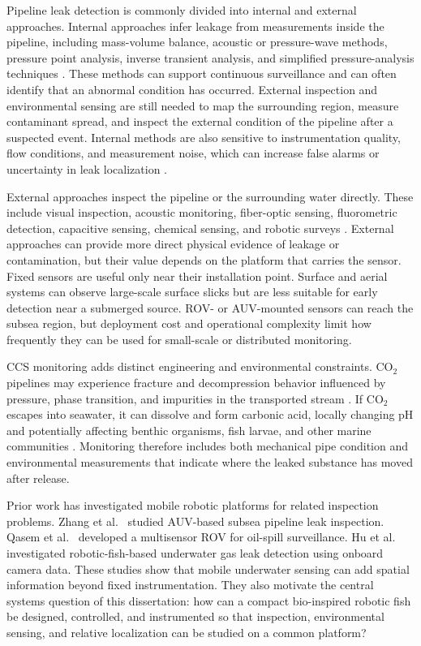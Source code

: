 \documentclass{uhcoethesis}
\begin{document}
Pipeline leak detection is commonly divided into internal and external approaches. Internal approaches infer leakage from measurements inside the pipeline, including mass-volume balance, acoustic or pressure-wave methods, pressure point analysis, inverse transient analysis, and simplified pressure-analysis techniques \cite{Martins2010,Hou2013,Akib2011,Vitkovsky2007,Ostapkowicz2016}. These methods can support continuous surveillance and can often identify that an abnormal condition has occurred. External inspection and environmental sensing are still needed to map the surrounding region, measure contaminant spread, and inspect the external condition of the pipeline after a suspected event. Internal methods are also sensitive to instrumentation quality, flow conditions, and measurement noise, which can increase false alarms or uncertainty in leak localization \cite{Reda2024}.

External approaches inspect the pipeline or the surrounding water directly. These include visual inspection, acoustic monitoring, fiber-optic sensing, fluorometric detection, capacitive sensing, chemical sensing, and robotic surveys \cite{Ho2020,Jasper2012,Lukonge2020,Adegboye2019}. External approaches can provide more direct physical evidence of leakage or contamination, but their value depends on the platform that carries the sensor. Fixed sensors are useful only near their installation point. Surface and aerial systems can observe large-scale surface slicks but are less suitable for early detection near a submerged source. ROV- or AUV-mounted sensors can reach the subsea region, but deployment cost and operational complexity limit how frequently they can be used for small-scale or distributed monitoring.

CCS monitoring adds distinct engineering and environmental constraints. \mbox{CO$_2$} pipelines may experience fracture and decompression behavior influenced by pressure, phase transition, and impurities in the transported stream \cite{Aursand2016,Cosham2009}. If \mbox{CO$_2$} escapes into seawater, it can dissolve and form carbonic acid, locally changing pH and potentially affecting benthic organisms, fish larvae, and other marine communities \cite{Zheng2021,Mortezaei2021,Queiros2014,Pham2016}. Monitoring therefore includes both mechanical pipe condition and environmental measurements that indicate where the leaked substance has moved after release.

Prior work has investigated mobile robotic platforms for related inspection problems. Zhang et al.~\cite{Zhang2021} studied AUV-based subsea pipeline leak inspection. Qasem et al.~\cite{Qasem2019} developed a multisensor ROV for oil-spill surveillance. Hu et al.~\cite{Hu2022} investigated robotic-fish-based underwater gas leak detection using onboard camera data. These studies show that mobile underwater sensing can add spatial information beyond fixed instrumentation. They also motivate the central systems question of this dissertation: how can a compact bio-inspired robotic fish be designed, controlled, and instrumented so that inspection, environmental sensing, and relative localization can be studied on a common platform?
\end{document}
